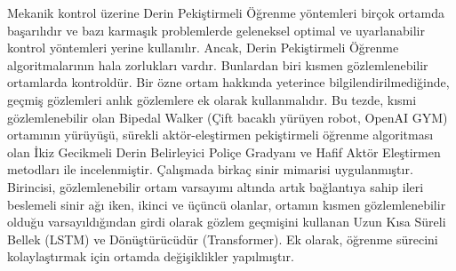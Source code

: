 Mekanik kontrol üzerine Derin Pekiştirmeli Öğrenme yöntemleri birçok ortamda başarılıdır ve bazı karmaşık problemlerde geleneksel optimal ve uyarlanabilir kontrol yöntemleri yerine kullanılır. 
Ancak, Derin Pekiştirmeli Öğrenme algoritmalarının hala zorlukları vardır. 
Bunlardan biri kısmen gözlemlenebilir ortamlarda kontroldür. 
Bir özne ortam hakkında yeterince bilgilendirilmediğinde, geçmiş gözlemleri anlık gözlemlere ek olarak kullanmalıdır. 
Bu tezde, kısmi gözlemlenebilir olan Bipedal Walker (Çift bacaklı yürüyen robot, OpenAI GYM) ortamının yürüyüşü, sürekli aktör-eleştirmen pekiştirmeli öğrenme algoritması olan İkiz Gecikmeli Derin Belirleyici Poliçe Gradyanı ve Hafif Aktör Eleştirmen metodları ile incelenmiştir.
Çalışmada birkaç sinir mimarisi uygulanmıştır. 
Birincisi, gözlemlenebilir ortam varsayımı altında artık bağlantıya sahip ileri beslemeli sinir ağı iken, ikinci ve üçüncü olanlar, 
ortamın kısmen gözlemlenebilir olduğu varsayıldığından girdi olarak gözlem geçmişini kullanan Uzun Kısa Süreli Bellek (LSTM) ve Dönüştürücüdür (Transformer). 
Ek olarak, öğrenme sürecini kolaylaştırmak için ortamda değişiklikler yapılmıştır. 